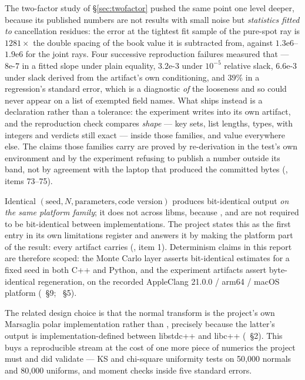 \documentclass[11pt,a4paper]{article}
\begin{document}
The two-factor study of \S\ref{sec:twofactor} pushed the same point one level deeper, because its
published numbers are not results with small noise but \emph{statistics fitted to} cancellation
residues: the error at the tightest fit sample of the pure-spot ray is $1281\times$ the double spacing
of the book value it is subtracted from, against $1.3\text{e}6$--$1.9\text{e}6$ for the joint rays.
Four successive reproduction failures measured that --- $8\text{e-}7$ in a fitted slope under plain
equality, $3.2\text{e-}3$ under $10^{-5}$ relative slack, $6.6\text{e-}3$ under slack derived from the
artifact's own conditioning, and $39\%$ in a regression's standard error, which is a diagnostic
\emph{of} the looseness and so could never appear on a list of exempted field names. What ships instead
is a declaration rather than a tolerance: the experiment writes
 into its own artifact, and the reproduction check
compares \emph{shape} --- key sets, list lengths, types, with integers and verdicts still exact ---
inside those families, and value everywhere else. The claims those families carry are proved by
re-derivation in the test's own environment and by the experiment refusing to publish a number outside
its band, not by agreement with the laptop that produced the committed bytes
(, items 73--75).

Identical $(\text{seed}, N, \text{parameters}, \text{code version})$ produces bit-identical
output \emph{on the same platform family}; it does not across libms, because ,
 and  are not required to be bit-identical between implementations. The
project states this as the first entry in its own limitations register and answers it by making
the platform part of the result: every artifact carries 
(, item 1). Determinism claims in this report are therefore scoped:
the Monte Carlo layer asserts bit-identical estimates for a fixed seed in both C++ and Python,
and the experiment artifacts assert byte-identical regeneration, on the recorded
AppleClang 21.0.0 / arm64 / macOS platform
(~\S9;
~\S5).

The related design choice is that the normal transform is the project's own Marsaglia polar
implementation rather than , precisely because the latter's
output is implementation-defined between libstdc++ and libc++
(~\S2). This buys a reproducible
stream at the cost of one more piece of numerics the project must and did validate --- KS and
chi-square uniformity tests on 50{,}000 normals and 80{,}000 uniforms, and moment checks inside
five standard errors.
\end{document}
